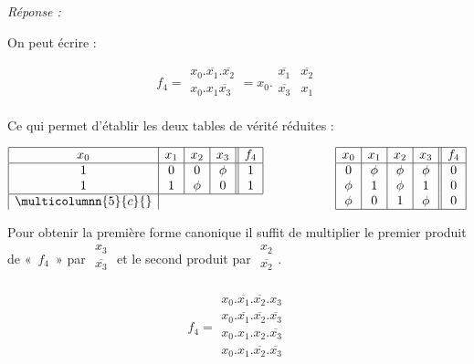 \begin{enumerate} [label=\arabic*$^\circ$]
 \emph{Réponse :}
 
 On peut écrire : 

  
  \[ f_4 = 
  \begin{array}{|c|}   
       x_0 . \overline{x_1} . \overline{x_2}  \\
       x_0 . x_1 \overline{x_3} \\
   \end{array}  = x_0 . \begin{array}{|c|c|} 
   							\overline{x_1} & \overline{x_2} \\
   							\overline{x_3} & x_1 \\
                        \end{array} 
  \]
  

 
 Ce qui permet d'établir les deux tables de vérité réduites : 
 
 
\[
\begin{array}{|c|c|c|c||c|}
\hline 
x_0 & x_1 &  x_2 & x_3 &   f_4 \\
\hline 
1 & 0 & 0 & \phi & 1 \\
1 & 1 & \phi & 0 & 1 \\
\hline 
\multicolumnn{5}{c}{} \\
\end{array} \hspace*{2 cm}
    \begin{array}{|c|c|c|c||c|}
	\hline 
	x_0 & x_1 &  x_2 & x_3 &   f_4 \\
	\hline 
	0  &  \phi &   \phi &  \phi & 0 \\
	\phi & 1  & \phi & 1 &  0 \\
		\phi& 0  & 1  & \phi &  0 \\
	\hline 
	\end{array} 
\] 

Pour obtenir la première forme canonique il suffit de multiplier le premier produit de «~$f_4$~» par
 $\begin{array}{|c|}
x_3  \\
\overline{x_3} \\  \end{array} $ et le second produit par  $\begin{array}{|c|}
x_2  \\
\overline{x_2} \\  \end{array}$.  



\[ f_4 = 
\begin{array}{|c|} 
     x_0 . \overline{x_1} . \overline{x_2} . x_3 \\
     x_0 . \overline{x_1} . \overline{x_2} . \overline{x_3} \\
     x_0 . x_1 . x_2 . \overline{x_3} \\
     x_0 . x_1 . \overline{x_2}  . \overline{x_3} \\     
\end{array}
\]




\end{enumerate}
